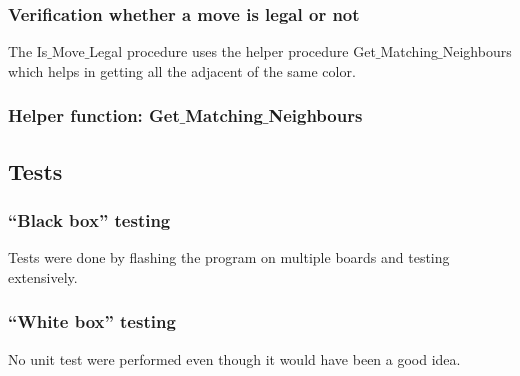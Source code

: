 \subsubsection{Verification whether a move is legal or not}

The Is$\_$Move$\_$Legal procedure uses the helper procedure Get$\_$Matching$\_$Neighbours which helps in getting all the adjacent \sqs of the same color.



\subsubsection{Helper function: Get$\_$Matching$\_$Neighbours}



\subsection{Tests}

\subsubsection{``Black box'' testing}
Tests were done by flashing the program on multiple boards and testing extensively.
\subsubsection{``White box'' testing}
No unit test were performed even though it would have been a good idea.

\newpage
